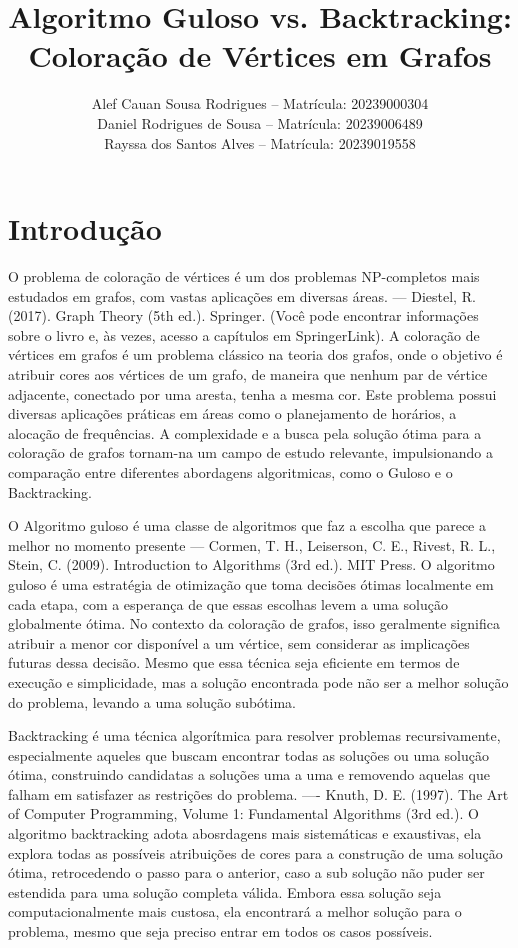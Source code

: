 \documentclass[12pt]{article}
\title{Algoritmo Guloso vs. Backtracking: Coloração de Vértices em Grafos}
\author{
    Alef Cauan Sousa Rodrigues -- Matrícula: 20239000304\inst{1} \\
    Daniel Rodrigues de Sousa -- Matrícula: 20239006489\inst{1} \\
    Rayssa dos Santos Alves -- Matrícula: 20239019558\inst{1} \\
}
\begin{document}
\maketitle

\section{Introdução}
O problema de coloração de vértices é um dos problemas NP-completos mais estudados em grafos, com vastas aplicações em diversas áreas. — Diestel, R. (2017). Graph Theory (5th ed.). Springer. (Você pode encontrar informações sobre o livro e, às vezes, acesso a capítulos em SpringerLink). A coloração de vértices em grafos é um problema clássico na teoria dos grafos, onde o objetivo é atribuir cores aos vértices de um grafo, de maneira que nenhum par de vértice adjacente, conectado por uma aresta, tenha a mesma cor. Este problema possui diversas aplicações práticas em áreas como o planejamento de horários, a alocação de frequências. A complexidade e a busca pela solução ótima para a coloração de grafos tornam-na um campo de estudo relevante, impulsionando a comparação entre diferentes abordagens algoritmicas, como o Guloso e o Backtracking. 

O Algoritmo guloso é uma classe de algoritmos que faz a escolha que parece a melhor no momento presente  — Cormen, T. H., Leiserson, C. E., Rivest, R. L.,  Stein, C. (2009). Introduction to Algorithms (3rd ed.). MIT Press. O algoritmo guloso é uma estratégia de otimização que toma decisões ótimas localmente em cada etapa, com a esperança de que essas escolhas levem a uma solução globalmente ótima. No contexto da coloração de grafos, isso geralmente significa atribuir a menor cor disponível a um vértice, sem considerar as implicações futuras dessa decisão. Mesmo que essa técnica seja eficiente em termos de execução e simplicidade, mas a solução encontrada pode não ser a melhor solução do problema, levando a uma solução subótima.

Backtracking é uma técnica algorítmica para resolver problemas recursivamente, especialmente aqueles que buscam encontrar todas as soluções ou uma solução ótima, construindo candidatas a soluções uma a uma e removendo aquelas que falham em satisfazer as restrições do problema. —- Knuth, D. E. (1997). The Art of Computer Programming, Volume 1: Fundamental Algorithms (3rd ed.). O algoritmo backtracking adota abosrdagens mais sistemáticas e exaustivas, ela explora todas as possíveis atribuições de cores para a construção de uma solução ótima, retrocedendo o passo para o anterior, caso a sub solução não puder ser estendida para uma solução completa válida. Embora essa solução seja computacionalmente mais custosa, ela encontrará a melhor solução para o problema, mesmo que seja preciso entrar em todos os casos possíveis.
\end{document}
